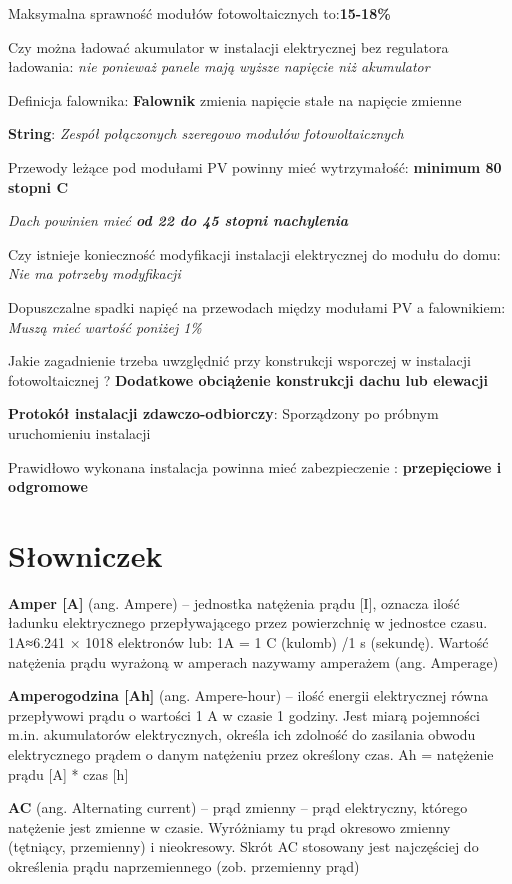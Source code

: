 \documentclass[12pt,a4paper]{article}
\begin{document}
Maksymalna sprawność modułów fotowoltaicznych to:\textbf{15-18\%}

Czy można ładować akumulator w instalacji elektrycznej bez regulatora ładowania:
\textit{nie ponieważ panele mają wyższe napięcie niż akumulator}

Definicja falownika:\textbf{ Falownik} zmienia napięcie stałe na napięcie zmienne

\textbf{String}: \textit{Zespół połączonych szeregowo modułów fotowoltaicznych}

Przewody leżące pod modułami PV powinny mieć wytrzymałość: \textbf{minimum 80 stopni C}


\textit{Dach powinien mieć \textbf{od 22 do 45 stopni nachylenia}}

Czy istnieje konieczność modyfikacji instalacji elektrycznej do modułu do domu:
\textit{Nie ma potrzeby modyfikacji}

Dopuszczalne spadki napięć na przewodach między modułami PV a falownikiem:
\textit{Muszą mieć wartość poniżej 1\%}

Jakie zagadnienie trzeba uwzględnić przy konstrukcji wsporczej w instalacji fotowoltaicznej ? \textbf{Dodatkowe obciążenie konstrukcji dachu lub elewacji}

\textbf{Protokół instalacji zdawczo-odbiorczy}: Sporządzony po próbnym uruchomieniu instalacji 

Prawidłowo wykonana instalacja powinna mieć zabezpieczenie : \textbf{przepięciowe i odgromowe}
\clearpage

\section{Słowniczek}
\textbf{Amper [A]} (ang. Ampere) – jednostka natężenia prądu [I], oznacza ilość ładunku elektrycznego przepływającego przez powierzchnię w jednostce czasu. 1A≈6.241 × 1018 elektronów lub: 1A = 1 C (kulomb) /1 s (sekundę). Wartość natężenia prądu wyrażoną w amperach nazywamy amperażem (ang. Amperage)

\textbf{Amperogodzina [Ah]} (ang. Ampere-hour) – ilość energii elektrycznej równa przepływowi prądu o wartości 1 A w czasie 1 godziny. Jest miarą pojemności m.in. akumulatorów elektrycznych, określa ich zdolność do zasilania obwodu elektrycznego prądem o danym natężeniu przez określony czas.
Ah = natężenie prądu  [A] * czas [h]

\textbf{AC} (ang. Alternating current) – prąd zmienny – prąd elektryczny, którego natężenie jest zmienne w czasie. Wyróżniamy tu prąd okresowo zmienny (tętniący, przemienny) i nieokresowy. Skrót AC stosowany jest najczęściej do określenia prądu naprzemiennego (zob. przemienny prąd)
\end{document}
